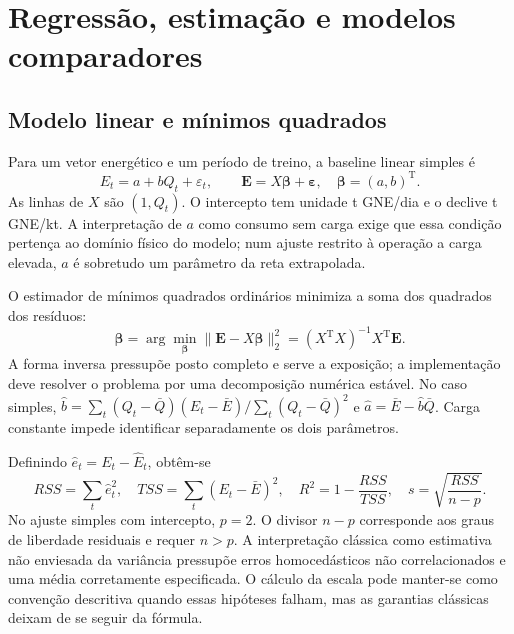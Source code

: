 
\section{Regressão, estimação e modelos comparadores}
\label{sec:mat-regressao}

\subsection{Modelo linear e mínimos quadrados}
\label{sec:mat-ols}
Para um vetor energético e um período de treino, a baseline linear simples
é
\begin{equation}
E_t=a+bQ_t+\varepsilon_t,
\qquad \boldsymbol E=X\boldsymbol\beta+\boldsymbol\varepsilon,
\quad \boldsymbol\beta=(a,b)^{\mathrm T}.
\label{eq:mat-modelo-linear}
\end{equation}
As linhas de $X$ são $(1,Q_t)$. O intercepto tem unidade t GNE/dia e o declive t GNE/kt. A interpretação de $a$ como consumo sem carga exige que essa condição pertença ao domínio físico do modelo; num ajuste restrito à operação a carga elevada, $a$ é sobretudo um parâmetro da reta extrapolada.

O estimador de mínimos quadrados ordinários minimiza a soma dos quadrados dos resíduos:
\begin{equation}
\widehat{\boldsymbol\beta}
=\arg\min_{\boldsymbol\beta}\|\boldsymbol E-X\boldsymbol\beta\|_2^2
=(X^{\mathrm T}X)^{-1}X^{\mathrm T}\boldsymbol E.
\label{eq:mat-ols}
\end{equation}
A forma inversa pressupõe posto completo e serve a exposição; a implementação deve resolver o problema por uma decomposição numérica estável. No caso simples, $\widehat b=\sum_t(Q_t-\bar Q)(E_t-\bar E)/\sum_t(Q_t-\bar Q)^2$ e $\widehat a=\bar E-\widehat b\bar Q$. Carga constante impede identificar separadamente os dois parâmetros.

Definindo $\widehat e_t=E_t-\widehat E_t$, obtêm-se
\begin{equation}
RSS=\sum_t\widehat e_t^2,
\quad TSS=\sum_t(E_t-\bar E)^2,
\quad R^2=1-\frac{RSS}{TSS},
\quad s=\sqrt{\frac{RSS}{n-p}}.
\label{eq:mat-rss-escala}
\end{equation}
No ajuste simples com intercepto, $p=2$. O divisor $n-p$ corresponde aos graus de liberdade residuais e requer $n>p$. A interpretação clássica como estimativa não enviesada da variância pressupõe erros homocedásticos não correlacionados e uma média corretamente especificada. O cálculo da escala pode manter-se como convenção descritiva quando essas hipóteses falham, mas as garantias clássicas deixam de se seguir da fórmula.

